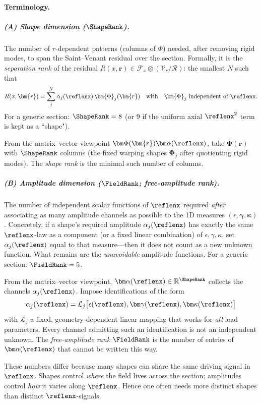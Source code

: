 

\paragraph{Terminology.}
\subparagraph{(A) Shape dimension (\(\ShapeRank\)).}
The number of \(r\)-dependent patterns (columns of \(\Phi\)) needed, after removing rigid modes, to span the Saint–Venant residual over the section. 
Formally, it is the \emph{separation rank} of the residual
\(R(x,\bm{r})\in \mathcal F_x\otimes(\mathcal V_r/\mathscr R)\): the smallest \(N\) such that
\[
R(x,\bm{r})=\sum_{j}^N \alpha_j(\reflenx)\,\bm{\Phi}_j(\bm{r})
\quad\text{with}\quad \bm{\Phi}_j\ \text{independent of }\reflenx.
\]
For a generic section: \(\ShapeRank=8\) (or \(9\) if the uniform axial \(\reflenx^2\) term is kept as a ``shape").

From the matrix–vector viewpoint \(\bm\Phi(\bm{r})\bm\alpha(\reflenx)\), take \(\bm\Phi(\bm{r})\) with \(\ShapeRank\) columns (the fixed warping shapes \(\bm{\Phi}_j\) after quotienting rigid modes).
The \emph{shape rank} is the minimal such number of columns.

\subparagraph{(B) Amplitude dimension (\(\FieldRank\); free‑amplitude rank).}
The number of independent scalar functions of \(\reflenx\) required \emph{after} associating as many amplitude channels as possible to the 1D measures \((\epsilon,\bm\gamma,\bm\kappa)\).
Concretely, if a shape’s required amplitude \(\alpha_j(\reflenx)\) has exactly the same \(\reflenx\)-law as a component (or a fixed linear combination) of \(\epsilon,\gamma,\kappa\), set \(\alpha_j(\reflenx)\) equal to that measure—then it does not count as a new unknown function.
What remains are the \emph{unavoidable} amplitude functions. For a generic section: \(\FieldRank=5\).

From the matrix–vector viewpoint, \(\bm\alpha(\reflenx)\in\mathbb R^{\ShapeRank}\) collects the channels \(\alpha_j(\reflenx)\).
Impose identifications of the form
\[
\alpha_j(\reflenx)=\mathcal L_j\big[\epsilon(\reflenx),\bm\gamma(\reflenx),\bm\kappa(\reflenx)\big]
\]
with \(\mathcal L_j\) a fixed, geometry‑dependent linear mapping that works for \emph{all} load parameters.
Every channel admitting such an identification is not an independent unknown.
The \emph{free‑amplitude rank} \(\FieldRank\) is the number of entries of \(\bm\alpha(\reflenx)\) that cannot be written this way.

\medskip
These numbers differ because many shapes can share the same driving signal in \(\reflenx\).
Shapes control \emph{where} the field lives across the section; amplitudes control \emph{how} it varies along \(\reflenx\).
Hence one often needs more distinct shapes than distinct \(\reflenx\)-signals.


